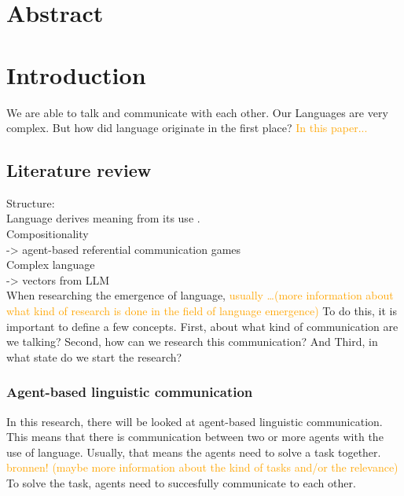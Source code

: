 \documentclass[a4paper, 12pt]{report}
\begin{document}
\setcounter{page}{1}
\pagestyle{plain} 

\chapter*{Abstract}

\tableofcontents


\chapter{Introduction}

\noindent We are able to talk and communicate with each other. 
Our Languages are very complex. 
But how did language originate in the first place? %
\textcolor{orange}{In this paper...}

\section{Literature review}
Structure: \\
Language derives meaning from its use \cite{Wittgenstein}. \\
Compositionality \\
-> agent-based referential communication games \\
Complex language \\
-> vectors from LLM \\

When researching the emergence of language, \textcolor{orange}{usually \dots (more information about what kind of research is done in the field of language emergence)}
To do this, it is important to define a few concepts. 
First, about what kind of communication are we talking?
Second, how can we research this communication? 
And Third, in what state do we start the research?

\subsection{Agent-based linguistic communication}
In this research, there will be looked at agent-based linguistic communication. 
This means that there is communication between two or more agents with the use of language. 
Usually, that means the agents need to solve a task together. 
\textcolor{orange}{bronnen! (maybe more information about the kind of tasks and/or the relevance)} 
To solve the task, agents need to succesfully communicate to each other. 
\end{document}
